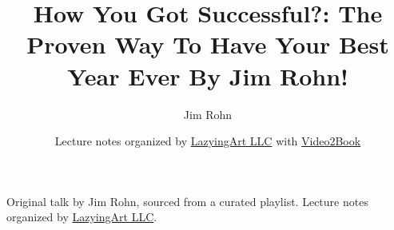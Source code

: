 \documentclass[11pt,oneside]{book}
\begin{document}
\frontmatter
\title{How You Got Successful?: The Proven Way To Have Your Best Year Ever By Jim Rohn!}
\author{Jim Rohn}
\date{Lecture notes organized by \href{https://lazying.art}{LazyingArt LLC} with \href{https://github.com/lachlanchen/Video2Book}{Video2Book}}
\maketitle
\begin{center}
\small Original talk by Jim Rohn, sourced from a curated playlist. Lecture notes organized by \href{https://lazying.art}{LazyingArt LLC}.
\end{center}
\clearpage
\mainmatter

\end{document}
